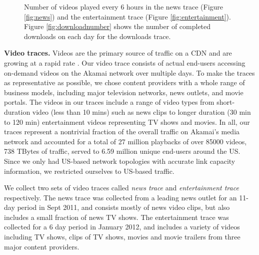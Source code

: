 {\begin{figure}
\begin{center}
{\label{fig:downloadnumber}}
\end{center}
\caption{Number of videos played every 6 hours in the news trace (Figure \ref{fig:news}) and  the entertainment trace (Figure \ref{fig:entertainment}).  Figure \ref{fig:downloadnumber} shows the number of completed downloads on each day for the downloads trace. }
\label{fig:akamaistats}
\end{figure}
}



\label{sec:CDNtraces}


{\bf Video traces.} Videos are the primary source of traffic on a CDN and are growing at a rapid rate \cite{nielsen-video-growth,cisco-videogrowth}. %
Our video trace consists of actual end-users accessing on-demand videos on the Akamai network over multiple days. To make the traces as representative as possible, we chose content providers with a whole range of business models, including major television networks, news outlets, and movie portals. The videos in our traces include a range of video types from  short-duration video (less than 10 mins) such as news clips to longer duration (30 min to 120 min) entertainment videos representing TV shows and movies. In all, our traces represent a nontrivial fraction of the overall traffic on Akamai's media network and accounted for a total of 27 million playbacks of over 85000 videos, 738  TBytes of traffic, served  to 6.59 million unique end-users around the US. Since we only had US-based network topologies with accurate link capacity information, we restricted ourselves to US-based traffic.

We collect two sets of video traces called  \emph{news trace} and \emph{entertainment trace} respectively.  The news trace was collected from a leading news outlet for an 11-day period in Sept 2011, and consists mostly of news video clips, but also includes a small fraction of news TV shows.  The entertainment trace was collected for a 6 day period in January 2012, and includes a variety of videos including TV shows, clips of TV shows,  movies and movie trailers from three major content providers.



